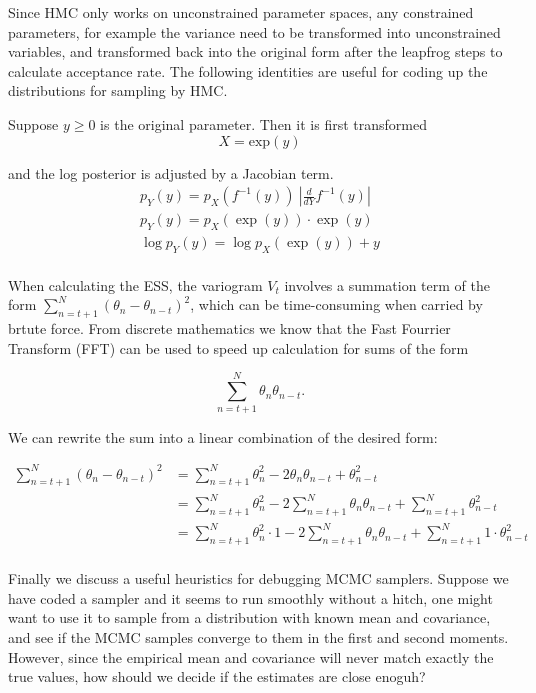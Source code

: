 \documentclass[]{report}
\begin{document}
Since HMC only works on unconstrained parameter spaces, any constrained parameters, for example the variance need to be transformed into unconstrained variables, and transformed back into the original form after the leapfrog steps to calculate acceptance rate. The following identities are useful for coding up the distributions for sampling by HMC.

Suppose $y \ge 0 $ is the original parameter. Then it is first transformed
 \[ X = \text{exp}(y)  \]
 
 and the log posterior is adjusted by a Jacobian term.
\begin{align*}
p_Y(y) = p_X(f^{-1}(y)) \ |\frac{d}{dY} f^{-1}(y) |\\
p_Y(y) = p_X(\exp(y)) \cdot \exp(y) \\
\log p_Y(y) = \log p_X(\exp(y)) + y \\
\end{align*}

When calculating the ESS, the variogram $V_t$ involves a summation term of the form $\sum_{n=t+1}^N (\theta_{n} - \theta_{n-t})^2$, which can be time-consuming when carried by brtute force. From discrete mathematics we know that the Fast Fourrier Transform (FFT) can be used to speed up calculation for sums of the form 

\[ \sum_{n=t+1}^N \theta_n \theta_{n-t}.  \]

We can rewrite the sum into a linear combination of the desired form:

\begin{align*}
 \sum_{n=t+1}^N (\theta_{n} - \theta_{n-t})^2 &= \sum_{n=t+1}^N \theta_n^2 - 2 \theta_n \theta_{n-t} + \theta_{n-t}^2  \\
 &= \sum_{n=t+1}^N \theta_n^2 -2 \sum_{n=t+1}^N \theta_n \theta_{n-t} + \sum_{n=t+1}^N \theta_{n-t}^2 \\ 
  &= \sum_{n=t+1}^N  \theta_n^2 \cdot 1  -2 \sum_{n=t+1}^N \theta_n \theta_{n-t} + \sum_{n=t+1}^N 1 \cdot \theta_{n-t}^2 \\
\end{align*}

Finally we discuss a useful heuristics for debugging MCMC samplers. Suppose we have coded a sampler and it seems to run smoothly without a hitch, one might want to use it to sample from a distribution with known mean and covariance, and see if the MCMC samples converge to them in the first and second moments. However, since the empirical mean and covariance will never match exactly the true values, how should we decide if the estimates are close enoguh?
\end{document}
